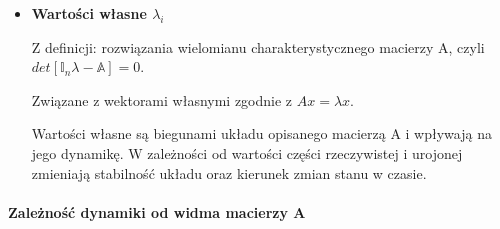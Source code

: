 \documentclass[a4paper, 12pt]{article}
\begin{document}
\begin{itemize}
		\item \textbf{Wartości własne $\lambda _i$}
		
		Z definicji: rozwiązania wielomianu charakterystycznego macierzy A, czyli $det[\mathbb{I}_n\lambda-\mathbb{A}] = 0$.
		
		Związane z wektorami własnymi zgodnie z $Ax=\lambda x$.
		
		Wartości własne są biegunami układu opisanego macierzą A i wpływają na jego dynamikę. W zależności od wartości części rzeczywistej i urojonej zmieniają stabilność układu oraz kierunek zmian stanu w czasie. 
	\end{itemize}
	

	
	\paragraph{Zależność dynamiki od widma macierzy A}
\end{document}
